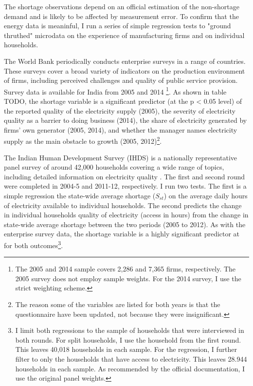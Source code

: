 \documentclass[11pt]{article}
\begin{document}
The shortage observations depend on an official estimation of the non-shortage demand and is likely to be affected by measurement error. To confirm that the energy data is meaninful, I run a series of simple regression tests to "ground thruthed" microdata on the experience of manufacturing firms and on individual households. 

The World Bank periodically conducts enterprise surveys in a range of countries. These surveys cover a broad variety of indicators on the production environment of firms, including perceived challenges and quality of public service provision. Survey data is available for India from 2005 and 2014 \citep{the_world_bank_enterprise_2020-1,the_world_bank_enterprise_2020-2}\footnote{The 2005 and 2014 sample covers 2,286 and 7,365 firms, respectively. The 2005 survey does not employ sample weights. For the 2014 survey, I use the strict weighting scheme.}. As shown in table TODO, the shortage variable is a significant predictor (at the p < 0.05 level) of the reported quality of the electricity supply (2005), the severity of electricity quality as a barrier to doing business (2014), the share of electricity generated by firms' own generator (2005, 2014), and whether the manager names electricity supply as the main obstacle to growth (2005, 2012)\footnote{The reason some of the variables are listed for both years is that the questionnaire have been updated, not because they were insignificant.}.

The Indian Human Development Survey (IHDS) is a nationally representative panel survey of around 42,000 households covering a wide range of topics, including detailed information on electricity quality \citep{desai_india_2018-1,desai_india_2018}. The first and second round were completed in 2004-5 and 2011-12, respectively. I run two tests. The first is a simple regression the state-wide average shortage (\(S_{st}\)) on the average daily hours of electricity available to individual households. The second predicts the change in individual households quality of electricity (access in hours) from the change in state-wide average shortage between the two periods (2005 to 2012). As with the enterprise survey data, the shortage variable is a highly significant predictor at for both outcomes\footnote{I limit both regressions to the sample of households that were interviewed in both rounds. For split households, I use the household from the first round. This leaves 40,018 households in each sample. For the regression, I further filter to only the households that have access to electricity. This leaves 28.944 households in each sample. As recommended by the official documentation, I use the original panel weights.}.
\end{document}
